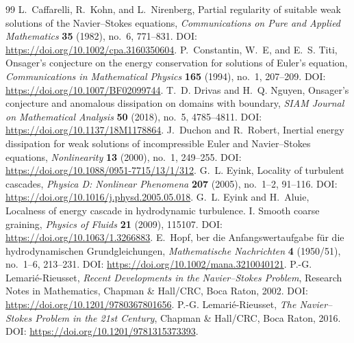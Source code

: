 \documentclass[10pt,a4paper]{amsart}
\numberwithin{equation}{section}
\begin{document}
\begin{thebibliography}{99}
 L.~Caffarelli, R.~Kohn, and L.~Nirenberg, \newblock Partial regularity of suitable weak solutions of the Navier--Stokes equations, \newblock \emph{Communications on Pure and Applied Mathematics} \textbf{35} (1982), no.~6, 771--831. \newblock DOI: \url{https://doi.org/10.1002/cpa.3160350604}.
 P.~Constantin, W.~E, and E.~S. Titi, \newblock Onsager's conjecture on the energy conservation for solutions of Euler's equation, \newblock \emph{Communications in Mathematical Physics} \textbf{165} (1994), no.~1, 207--209. \newblock DOI: \url{https://doi.org/10.1007/BF02099744}.
 T.~D. Drivas and H.~Q. Nguyen, \newblock Onsager's conjecture and anomalous dissipation on domains with boundary, \newblock \emph{SIAM Journal on Mathematical Analysis} \textbf{50} (2018), no.~5, 4785--4811. \newblock DOI: \url{https://doi.org/10.1137/18M1178864}.
 J.~Duchon and R.~Robert, \newblock Inertial energy dissipation for weak solutions of incompressible Euler and Navier--Stokes equations, \newblock \emph{Nonlinearity} \textbf{13} (2000), no.~1, 249--255. \newblock DOI: \url{https://doi.org/10.1088/0951-7715/13/1/312}.
 G.~L. Eyink, \newblock Locality of turbulent cascades, \newblock \emph{Physica D: Nonlinear Phenomena} \textbf{207} (2005), no.~1--2, 91--116. \newblock DOI: \url{https://doi.org/10.1016/j.physd.2005.05.018}.
 G.~L. Eyink and H.~Aluie, \newblock Localness of energy cascade in hydrodynamic turbulence. I. Smooth coarse graining, \newblock \emph{Physics of Fluids} \textbf{21} (2009), 115107. \newblock DOI: \url{https://doi.org/10.1063/1.3266883}.
 E.~Hopf, ber die Anfangswertaufgabe f{\"u}r die hydrodynamischen Grundgleichungen, \newblock \emph{Mathematische Nachrichten} \textbf{4} (1950/51), no.~1--6, 213--231. \newblock DOI: \url{https://doi.org/10.1002/mana.3210040121}.
 P.-G. Lemari\'e-Rieusset, \newblock \emph{Recent Developments in the Navier--Stokes Problem}, \newblock Research Notes in Mathematics, Chapman \& Hall/CRC, Boca Raton, 2002. \newblock DOI: \url{https://doi.org/10.1201/9780367801656}.
 P.-G. Lemari\'e-Rieusset, \newblock \emph{The Navier--Stokes Problem in the 21st Century}, \newblock Chapman \& Hall/CRC, Boca Raton, 2016. \newblock DOI: \url{https://doi.org/10.1201/9781315373393}.

\end{thebibliography}
\end{document}
